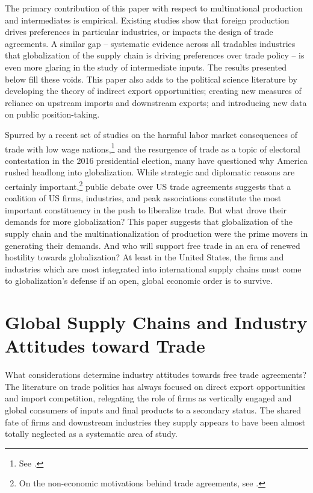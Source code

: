 \documentclass[hidelinks,12pt,letter]{article}
\begin{document}
The primary contribution of this paper with respect to multinational production and intermediates is empirical. Existing studies show that foreign production drives preferences in particular industries, or impacts the design of trade agreements. A similar gap -- systematic evidence across all tradables industries that globalization of the supply chain is driving preferences over trade policy -- is even more glaring in the study of intermediate inputs. The results presented below fill these voids. This paper also adds to the political science literature by developing the theory of indirect export opportunities; creating new measures of reliance on upstream imports and downstream exports; and introducing new data on public position-taking. 

Spurred by a recent set of studies on the harmful labor market consequences of trade with low wage nations,\footnote{See \citealt{david2013china,pierce2012surprisingly}.} and the resurgence of trade as a topic of electoral contestation in the 2016 presidential election, many have questioned why America rushed headlong into globalization. While strategic and diplomatic reasons are certainly important,\footnote{On the non-economic motivations behind trade agreements, see \citealt{gowa1993power, mansfield1997alliances, gowa2005exclusive, mansfield2012votes}.} public debate over US trade agreements suggests that a coalition of US firms, industries, and peak associations constitute the most important constituency in the push to liberalize trade. But what drove their demands for more globalization? This paper suggests that globalization of the supply chain and the multinationalization of production were the prime movers in generating their demands. And who will support free trade in an era of renewed hostility towards globalization? At least in the United States, the firms and industries which are most integrated into international supply chains must come to globalization's defense if an open, global economic order is to survive.

\section*{Global Supply Chains and Industry Attitudes toward Trade}
What considerations determine industry attitudes towards free trade agreements? The literature on trade politics has always focused on direct export opportunities and import competition, relegating the role of firms as vertically engaged and global consumers of inputs and final products to a secondary status. The shared fate of firms and downstream industries they supply appears to have been almost totally neglected as a systematic area of study. 
\end{document}
